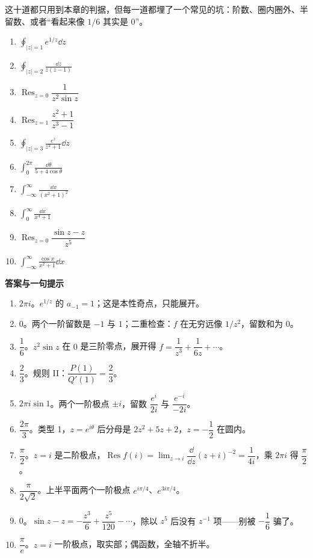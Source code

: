 \documentclass[11pt]{ctexart}
\let\orighdr\hdr
\renewcommand{\hdr}[2]{\par\orighdr{#1}{#2}}
\begin{document}
\flowerrule


这十道都只用到本章的判据，但每一道都埋了一个常见的坑：阶数、圈内圈外、半留数、或者“看起来像 $1/6$ 其实是 0”。

\begin{enumerate}
\item $\displaystyle\oint_{|z|=1}e^{1/z}\dd z$
\item $\displaystyle\oint_{|z|=2}\frac{\dd z}{z(z-1)}$
\item $\operatorname{Res}_{z=0}\dfrac{1}{z^{2}\sin z}$
\item $\operatorname{Res}_{z=1}\dfrac{z^{2}+1}{z^{3}-1}$
\item $\displaystyle\oint_{|z|=3}\frac{e^{z}}{z^{2}+1}\dd z$
\item $\displaystyle\int_0^{2\pi}\frac{\dd\theta}{5+4\cos\theta}$
\item $\displaystyle\int_{-\infty}^{\infty}\frac{\dd x}{(x^{2}+1)^{2}}$
\item $\displaystyle\int_0^{\infty}\frac{\dd x}{x^{4}+1}$
\item $\operatorname{Res}_{z=0}\dfrac{\sin z-z}{z^{5}}$
\item $\displaystyle\int_{-\infty}^{\infty}\frac{\cos x}{x^{2}+1}\dd x$
\end{enumerate}

\textbf{答案与一句提示}

\begin{enumerate}
\item $2\pi i$。$e^{1/z}$ 的 $a_{-1}=1$；这是本性奇点，只能展开。
\item $0$。两个一阶留数是 $-1$ 与 $1$；二重检查：$f$ 在无穷远像 $1/z^{2}$，留数和为 0。
\item $\dfrac16$。$z^{2}\sin z$ 在 $0$ 是三阶零点，展开得 $f=\dfrac{1}{z^{3}}+\dfrac{1}{6z}+\cdots$。
\item $\dfrac23$。规则 II：$\dfrac{P(1)}{Q'(1)}=\dfrac{2}{3}$。
\item $2\pi i\sin 1$。两个一阶极点 $\pm i$，留数 $\dfrac{e^{i}}{2i}$ 与 $\dfrac{e^{-i}}{-2i}$。
\item $\dfrac{2\pi}{3}$。类型 1，$z=e^{i\theta}$ 后分母是 $2z^{2}+5z+2$，$z=-\dfrac12$ 在圆内。
\item $\dfrac{\pi}{2}$。$z=i$ 是二阶极点，$\operatorname{Res}f(i)=\lim_{z\to i}\dfrac{\dd}{\dd z}(z+i)^{-2}=\dfrac{1}{4i}$，乘 $2\pi i$ 得 $\dfrac{\pi}{2}$。
\item $\dfrac{\pi}{2\sqrt2}$。上半平面两个一阶极点 $e^{i\pi/4}$、$e^{3i\pi/4}$。
\item $0$。$\sin z-z=-\dfrac{z^{3}}{6}+\dfrac{z^{5}}{120}-\cdots$，除以 $z^{5}$ 后没有 $z^{-1}$ 项——别被 $-\dfrac16$ 骗了。
\item $\dfrac{\pi}{e}$。$z=i$ 一阶极点，取实部；偶函数，全轴不折半。
\end{enumerate}
\end{document}
